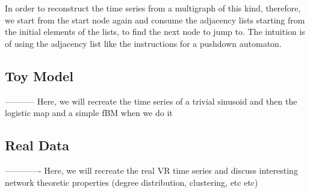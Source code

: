 \documentclass[12pt]{article}
\begin{document}
In order to reconstruct the time series from a multigraph of this kind, therefore, we start from the start node again and consume the adjacency lists starting from the initial elements of the lists, to find the next node to jump to. The intuition is of using the adjacency list like the instructions for a pushdown automaton\cite{pushdown}.


\subsection{Toy Model}

----------- Here, we will recreate the time series of a trivial sinusoid and then the logistic map and a simple fBM when we do it

\subsection{Real Data}

------------- Here, we will recreate the real VR time series and discuss interesting network theoretic properties (degree distribution, clustering, etc etc)
\end{document}
